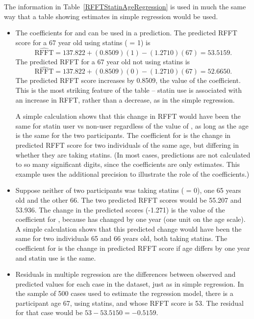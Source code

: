 The information in Table~\ref{RFFTStatinAgeRegression} is used in much the same way that a table showing estimates in simple regression would be used.

\begin{itemize}
	
	\item The coefficients for  and  can be used in a prediction.  The predicted RFFT score for a 67 year old using statins ( = 1) is 
	\[
	 \widehat{\text{RFFT}} = 137.822 + (0.8509)(1) - (1.2710)(67) = 53.5159.
	\]
The predicted RFFT for a 67 year old not using statins is
	\[
	 \widehat{\text{RFFT}} = 137.822 + (0.8509)(0) - (1.2710)(67) = 52.6650.
	\]
The predicted RFFT score increases by 0.8509, the value of the  coefficient.  This is the most striking feature of the table -- statin use is  associated with an increase in RFFT, rather than a decrease, as in the simple regression.

A simple calculation shows that this change in RFFT would have been the same for statin user vs non-user regardless of the value of , as long as the age is the same for the two participants. The coefficient for  is the change in predicted RFFT score for two individuals of the same age, but differing in whether they are taking statins.  (In most cases, predictions are not calculated to so many significant digits, since the coefficients are only estimates.  This example uses the additional precision to illustrate the role of the coefficients.)
	
	\item  Suppose neither of two participants was taking statins ( = 0), one 65 years old and the other 66.  The two predicted RFFT scores would be  55.207 and 53.936. The change in the predicted scores (-1.271) is the value of the coefficient for , because  has changed by one year (one unit on the age scale).   A simple calculation shows that this predicted change would have been the same for two individuals 65 and 66 years old, both taking statins.  The coefficient for  is the change in predicted RFFT score if age differs by one year and statin use is the same.
	
	\item Residuals in multiple regression are the differences between observed and predicted values for each case in the dataset, just as in simple regression.  In the sample of 500 cases used to estimate the regression model, there is a participant age 67, using statins, and whose RFFT score is 53.  The residual for that case would be $53 - 53.5150 = - 0.5159$.
	

\end{itemize}
